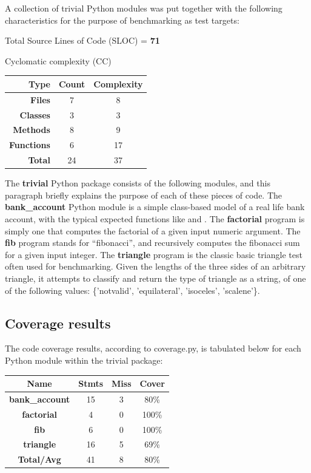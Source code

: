 \documentclass{icldt}
\numberwithin{equation}{section}       %
\begin{document}
{{A collection of \textsf{trivial} Python modules was put together with the following characteristics for the purpose of benchmarking as test targets:

Total Source Lines of Code (SLOC) = \textbf{71}

Cyclomatic complexity (CC)

\begin{tabularx}{\textwidth}{ |r|c|c| }
  \hline
  \textbf{Type} & \textbf{Count} & \textbf{Complexity} \\
  \hline
  \textbf{Files} & 7 & 8  \\
  \hline
  \textbf{Classes} & 3 & 3  \\
  \hline
  \textbf{Methods} & 8 & 9  \\
  \hline
  \textbf{Functions} & 6 & 17  \\
  \hline
  \textbf{Total} & 24 & 37 \\
  \hline
\end{tabularx}

The \textbf{trivial} Python package consists of the following modules, and this paragraph briefly explains the purpose of each of these pieces of code. The \textbf{bank_account} Python module is a simple class-based model of a real life bank account, with the typical expected functions like  and . The \textbf{factorial} program is simply one that computes the factorial of a given input numeric argument. The \textbf{fib} program stands for ``fibonacci'', and recursively computes the fibonacci sum for a given input integer. The \textbf{triangle} program is the classic basic triangle test often used for benchmarking. Given the lengths of the three sides of an arbitrary triangle, it attempts to classify and return the type of triangle as a string, of one of the following values: \{'notvalid', 'equilateral', 'isoceles', 'scalene'\}.

\subsection{Coverage results}

The code coverage results, according to \textsf{coverage.py}, is tabulated below for each Python module within the \textsf{trivial} package:

\begin{tabularx}{\textwidth}{ |c|c|c|c| }
  \hline
  \textbf{Name} & \textbf{Stmts} & \textbf{Miss} & \textbf{Cover} \\
  \hline
  \textbf{bank_account} & 15 & 3 & 80\%  \\
  \hline
  \textbf{factorial} & 4 & 0 & 100\%  \\
  \hline
  \textbf{fib} & 6 & 0 & 100\%  \\
  \hline
  \textbf{triangle} & 16 & 5 & 69\%  \\
  \hline
  \textbf{Total/Avg} & 41 & 8 & 80\% \\
  \hline
\end{tabularx}

}}
\end{document}
